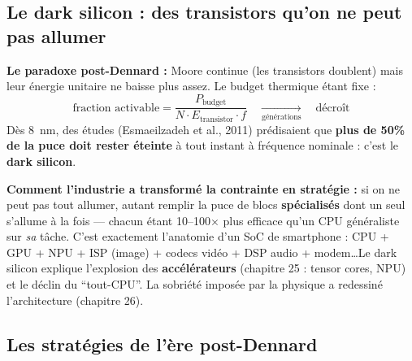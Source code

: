 \documentclass[12pt,a4paper,twoside]{book}
\begin{document}
\subsection{Le dark silicon : des transistors qu'on ne peut pas allumer}

\begin{formule}
\textbf{Le paradoxe post-Dennard :} Moore continue (les transistors doublent) mais leur énergie unitaire ne baisse plus assez. Le budget thermique étant fixe :
\[
\text{fraction activable} = \frac{P_{\text{budget}}}{N \cdot E_{\text{transistor}} \cdot f} \quad \xrightarrow[\text{générations}]{} \quad \text{décroît}
\]
Dès \SI{8}{nm}, des études (Esmaeilzadeh et al., 2011) prédisaient que \textbf{plus de 50\% de la puce doit rester éteinte} à tout instant à fréquence nominale : c'est le \textbf{dark silicon}.
\end{formule}

\begin{intuition}
\textbf{Comment l'industrie a transformé la contrainte en stratégie :} si on ne peut pas tout allumer, autant remplir la puce de blocs \textbf{spécialisés} dont un seul s'allume à la fois --- chacun étant 10--100$\times$ plus efficace qu'un CPU généraliste sur \textit{sa} tâche. C'est exactement l'anatomie d'un SoC de smartphone : CPU + GPU + NPU + ISP (image) + codecs vidéo + DSP audio + modem\ldots Le dark silicon explique l'explosion des \textbf{accélérateurs} (chapitre 25 : tensor cores, NPU) et le déclin du ``tout-CPU''. La sobriété imposée par la physique a redessiné l'architecture (chapitre 26).
\end{intuition}

\subsection{Les stratégies de l'ère post-Dennard}
\end{document}

